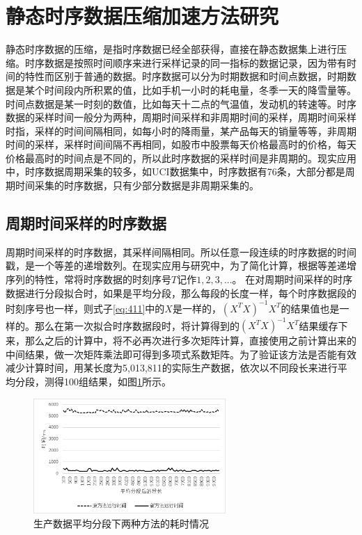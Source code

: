 \section{静态时序数据压缩加速方法研究}

静态时序数据的压缩，是指时序数据已经全部获得，直接在静态数据集上进行压缩。时序数据是按照时间顺序来进行采样记录的同一指标的数据记录，因为带有时间的特性而区别于普通的数据。时序数据可以分为时期数据和时间点数据，时期数据是某个时间段内所积累的值，比如手机一小时的耗电量，冬季一天的降雪量等。时间点数据是某一时刻的数值，比如每天十二点的气温值，发动机的转速等。时序数据的采样时间一般分为两种，周期时间采样和非周期时间的采样，周期时间采样时指，采样的时间间隔相同，如每小时的降雨量，某产品每天的销量等等，非周期时间的采样，采样时间间隔不再相同，如股市中股票每天价格最高时的价格，每天价格最高时的时间点是不同的，所以此时序数据的采样时间是非周期的。现实应用中，时序数据周期采集的较多，如UCI数据集中，时序数据有76条，大部分都是周期时间采集的时序数据，只有少部分数据是非周期采集的。

\subsection{周期时间采样的时序数据}
周期时间采样的时序数据，其采样间隔相同。所以任意一段连续的时序数据的时间戳，是一个等差的递增数列。在现实应用与研究中，为了简化计算，根据等差递增序列的特性，常将时序数据的时刻序号$T$记作$1, 2, 3, ...$。
在对周期时间采样的时序数据进行分段拟合时，如果是平均分段，那么每段的长度一样，每个时序数据段的时刻序号也一样，则式子\ref{eq:411}中的$X$是一样的，$(X^TX)^{-1}X^T$的结果值也是一样的。那么在第一次拟合时序数据段时，将计算得到的$(X^TX)^{-1}X^T$结果缓存下来，那么之后的计算中，将不必再次进行多次矩阵计算，直接使用之前计算出来的中间结果，做一次矩阵乘法即可得到多项式系数矩阵。为了验证该方法是否能有效减少计算时间，用某长度为5,013,811的实际生产数据，依次以不同段长来进行平均分段，测得100组结果，如图\ref{fig:fig42}所示。

\begin{figure}[htb]
	\centering
	\includegraphics[width=0.65\textwidth]{figures/figure4x2}
	\caption{生产数据平均分段下两种方法的耗时情况}\label{fig:fig42}
\end{figure}

